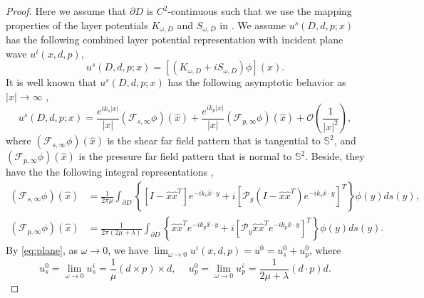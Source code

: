 \documentclass[a4paper,11pt]{article}
\theoremstyle{remark}
\theoremstyle{definition}
\numberwithin{equation}{section}
\begin{document}
\begin{proof}
Here we assume that $\partial D$ is $C^2$-continuous such that we use the mapping properties of the layer potentials $K_{\omega, D}$ and $S_{\omega, D}$ in \cite{PH}.
We assume $u^s(D,d, p;x)$ has the following combined layer potential representation \cite{PH} with incident plane wave $u^i(x,d,p)$,
\[
u^s(D,d, p;x) = [(K_{\omega, D} + i S_{\omega, D})\phi](x).
\]
It is well known that $u^s(D,d, p;x)$ has the following asymptotic behavior as $|x|\rightarrow \infty$ \cite{AK},
\begin{equation}\label{eq:scatter:repre:rigi}
 u^s(D,d, p;x)= \frac{e^{ik_s|x|}}{|x|}(\mathcal{F}_{s,\infty}\phi)(\hat{x})+ \frac{e^{ik_p|x|}}{|x|} (\mathcal{F}_{p,\infty}\phi)(\hat{x}) + \mathcal{O}(\frac{1}{|x|^2}),
\end{equation}
where $(\mathcal{F}_{s,\infty}\phi)(\hat{x})$ is the shear far
field pattern that is tangential to $\mathbb{S}^2$, and $(\mathcal{F}_{p,\infty}\phi)(\hat{x})$ is the pressure far field pattern that is normal to $\mathbb{S}^2$.
Beside, they have the the following integral representations \cite{AK},
\begin{align}
(\mathcal{F}_{s,\infty}\phi)(\hat{x})&= \frac{1}{2\pi \mu}\int_{\partial D}\left\{ [I -\hat{x}\hat{x}^{T}]e^{-ik_s\hat{x}\cdot y} + i [\mathcal{P}_{y}(I-\hat{x}\hat{x}^{T})e^{-ik_s\hat{x}\cdot y}]^{T}\right\}\phi(y)ds(y),\label{eq:far:s:asy}\\
(\mathcal{F}_{p,\infty}\phi)(\hat{x})& = \frac{1}{2\pi (2\mu + \lambda)}\int_{\partial D}\left\{ \hat{x}\hat{x}^{T}e^{-ik_p\hat{x}\cdot y} + i [\mathcal{P}_{y}\hat{x}\hat{x}^{T}e^{-ik_p\hat{x}\cdot y}]^{T}\right\}\phi(y)ds(y).  \label{eq:far:p:asy}
\end{align}
By \eqref{eq:plane}, as $\omega \rightarrow 0$, we have $\lim_{\omega \rightarrow 0}u^i(x,d,p) = u^0 = u_{s}^{0} + u_{p}^0$, where
\begin{equation}\label{eq:lowlimit}
u_{s}^{0}=  \lim_{\omega \rightarrow 0} u_{s}^i =  \frac{1}{\mu} (d\times p)\times d,\ \quad u_{p}^0 =  \lim_{\omega \rightarrow 0} u_{p}^i = \frac{1}{2\mu + \lambda}(d\cdot p) d.
\end{equation}


\end{proof}
\end{document}
